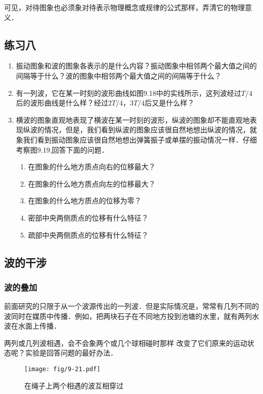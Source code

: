 可见，对待图象也必须象对待表示物理概念或规律的公式那样，弄清它的物理意义．

\subsection*{练习八}
\begin{enumerate}
    \item 振动图象和波的图象各表示的是什么内容？振动图象中相邻两个最大值之间的间隔等于什么？波的图象中相邻两个最大值之间的间隔等于什么？
    \item 有一列波，它在某一时刻的波形曲线如图9.18中的实线所示，这列波经过$T/4$后的波形曲线是什么样？经过$2T/4$，$3T/4$后又是什么样？
    \item 横波的图象直观地表现了横波在某一时刻的波形，纵波的图象却不能直观地表现纵波的情况，但是，我们看到纵波的图象应该很自然地想出纵波的情况，就象我们看到振动图象应该很自然地想出弹簧振子或单摆的振动情况一样．仔细考察图9.19,回答下面的问题．
    \begin{enumerate}
        \item 在图象的什么地方质点向右的位移最大？
        \item 在图象的什么地方质点向左的位移最大？
        \item 在图象的什么地方质点的位移为零？
        \item 密部中央两侧质点的位移有什么特征？
        \item 疏部中央两侧质点的位移有什么特征？
    \end{enumerate}
\end{enumerate}

\subsection{波的干涉}
\subsubsection{波的叠加} 

前面研究的只限于从一个波源传出的一列波．但是实际情况是，常常有几列不同的波同时在媒质中传播．例如，把两块石子在不同地方投到池塘的水里，就有两列水波在水面上传播．

两列或几列波相遇，会不会象两个或几个球相碰时那样
改变了它们原来的运动状态呢？实验是回答问题的最好办法．

\begin{figure}[htp]\centering
\texttt{[image: fig/9-21.pdf]}
\caption{在绳子上两个相遇的波互相穿过}
\end{figure}

